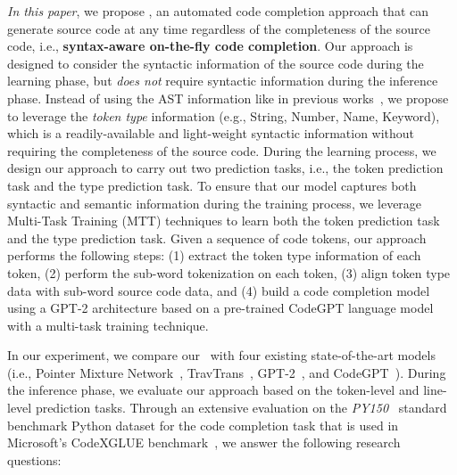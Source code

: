 \emph{In this paper}, we propose \our, an automated code completion approach that can generate source code at any time regardless of the completeness of the source code, i.e., \textbf{syntax-aware on-the-fly code completion}.
Our approach is designed to consider the syntactic information of the source code during the learning phase, but \emph{does not} require syntactic information during the inference phase.
Instead of using the AST information like in previous works~\cite{kim2021code, izadi2022codefill, li2017code, svyatkovskiy2019pythia, liu2020self, liu2022unified}, we propose to leverage the \emph{token type} information (e.g., String, Number, Name, Keyword), which is a readily-available and light-weight syntactic information without requiring the completeness of the source code.
During the learning process, we design our approach to carry out two prediction tasks, i.e., the token prediction task and the type prediction task.
To ensure that our model captures both syntactic and semantic information during the training process, we leverage Multi-Task Training (MTT) techniques to learn both the token prediction task and the type prediction task. 
Given a sequence of code tokens, our approach performs the following steps: (1) extract the token type information of each token, (2) perform the sub-word tokenization on each token, (3) align token type data with sub-word source code data, and (4) build a code completion model using a GPT-2 architecture based on a pre-trained CodeGPT language model with a multi-task training technique.

In our experiment, we compare our \our~with four existing state-of-the-art models (i.e., Pointer Mixture Network~\cite{li2017code}, TravTrans~\cite{kim2021code}, GPT-2~\cite{radford2019language}, and CodeGPT~\cite{lu2021codexglue}).
During the inference phase, we evaluate our approach based on the token-level and line-level prediction tasks.
Through an extensive evaluation on the \textit{PY150}~\cite{raychev2016probabilistic} standard benchmark Python dataset for the code completion task that is used in Microsoft's CodeXGLUE benchmark~\cite{lu2021codexglue}, we answer the following research questions:

